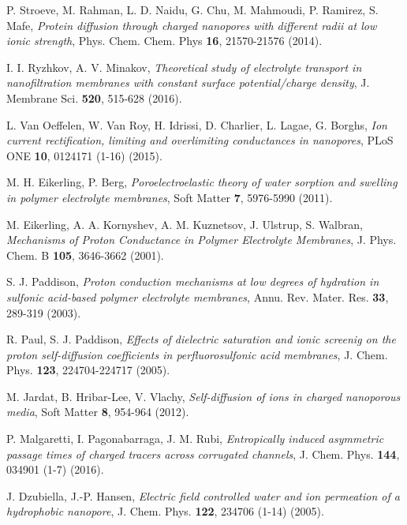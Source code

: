 \documentclass[3p,english,preprint]{elsarticle}
\begin{document}
\begin{thebibliography}{00}
 P. Stroeve, M.  Rahman, L. D.  Naidu, G. Chu,  M. Mahmoudi, P. Ramirez,  S. Mafe,  
{\it Protein diffusion through charged nanopores with different 
radii at low ionic strength}, 
 Phys. Chem. Chem. Phys {\bf 16}, 21570-21576 (2014).



I. I. Ryzhkov, A. V.  Minakov,  
{\it Theoretical study of electrolyte transport in nanofiltration membranes 
with constant surface potential/charge density}, 
 J.  Membrane Sci. {\bf 520},  515-628 (2016). 

L. Van Oeffelen, W.  Van Roy, H.  Idrissi, D. Charlier, L. Lagae, G. Borghs,  
{\it Ion current rectification, limiting and overlimiting conductances in nanopores}, 
 PLoS ONE {\bf 10},  0124171 (1-16) (2015).



 M. H. Eikerling,  P. Berg, 
{\it Poroelectroelastic theory of water sorption and swelling in polymer electrolyte membranes},
 Soft Matter {\bf  7}, 5976-5990 (2011).
 

M. Eikerling, A. A. Kornyshev, A. M. Kuznetsov, J. Ulstrup, S. Walbran,
{\it Mechanisms of Proton Conductance in Polymer Electrolyte Membranes},
J. Phys. Chem. B {\bf 105}, 3646-3662 (2001).

S. J. Paddison,
{\it  Proton conduction mechanisms at low degrees of
hydration in sulfonic acid-based polymer electrolyte
membranes}, 
Annu. Rev. Mater. Res. {\bf 33}, 289-319 (2003).


R. Paul, S. J. Paddison, 
{\it Effects of dielectric saturation and ionic screenig on the proton self-diffusion
coefficients in perfluorosulfonic acid membranes},
J. Chem. Phys. {\bf 123}, 224704-224717 (2005).


M. Jardat, B. Hribar-Lee, V.  Vlachy,
{\it Self-diffusion of ions in charged nanoporous media}, 
Soft Matter {\bf 8}, 954-964  (2012). 


P. Malgaretti, I.  Pagonabarraga, J.  M. Rubi,  
{\it Entropically induced asymmetric passage times of charged tracers across corrugated channels},
 J.  Chem. Phys. {\bf 144}, 034901 (1-7) (2016).



J. Dzubiella, J.-P. Hansen, 
{\it Electric field controlled water and ion permeation 
of a hydrophobic nanopore}, 
J. Chem. Phys. {\bf 122}, 234706 (1-14) (2005).


\end{thebibliography}
\end{document}
